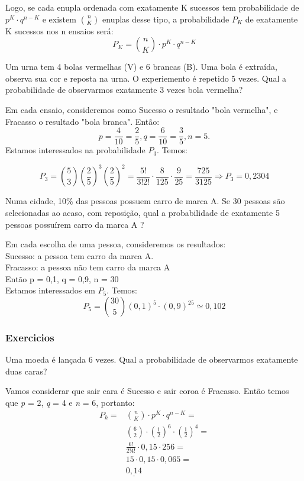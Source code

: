 \documentclass[10pt,a4paper]{article}
\begin{document}
Logo, se cada enupla ordenada com exatamente K sucessos tem probabilidade de $p^{K} \cdot q^{n-K}$ e existem $\binom{n}{K}$ enuplas desse tipo, a probabilidade $P_{K}$ de exatamente K sucessos nos n ensaios será:
\[
	P_{K} = \binom{n}{K} \cdot p^{K} \cdot q^{n-K}
\]

\begin{eg}
	Um urna tem 4 bolas vermelhas (V) e 6 brancas (B). Uma bola é extraída, observa sua cor e reposta na urna. O experiemento é repetido 5 vezes. Qual a probabilidade de observarmos exatamente 3 vezes bola vermelha?


Em cada ensaio, consideremos como Sucesso o resultado "bola vermelha", e Fracasso o resultado "bola branca". Então:
	\[
		p = \frac{4}{10} = \frac{2}{5}, q = \frac{6}{10} = \frac{3}{5}, n = 5.	
	\]
	Estamos interessados na probabilidade $P_{3}$. Temos:
	
	\[
		P_{3} = \binom{5}{3}(\frac{2}{5})^{3} (\frac{2}{5})^{2} = \frac{5!}{3!2!} \cdot \frac{8}{125} \cdot \frac{9}{25} = \frac{725}{3125} \Rightarrow
		P_{3} = 0,2304
	\]
\end{eg}

\begin{eg}
	Numa cidade, 10\% das pessoas possuem carro de marca A. Se 30 pessoas são selecionadas ao acaso, com reposição, qual a probabilidade de exatamente 5 pessoas possuírem carro da marca A ?
	
	Em cada escolha de uma pessoa, consideremos os resultados:\\
	Sucesso: a pessoa tem carro da marca A.\\
	Fracasso: a pessoa não tem carro da marca A\\
	Então p = 0,1,    q = 0,9,    n = 30\\
	Estamos interessados em $P_{5}$. Temos:
	\[
		P_{5} = \binom{30}{5}(0,1)^{5} \cdot (0,9)^{25} \simeq 0,102	
	\]
\end{eg}

\subsubsection{Exercicios}
\begin{ex}
	Uma moeda é lançada 6 vezes. Qual a probabilidade de observarmos exatamente duas caras?
\end{ex}
\begin{sol}
	Vamos considerar que sair cara é Sucesso e sair coroa é Fracasso. Então temos que \textit{p} = 2, \textit{q} = 4 e \textit{n} = 6, portanto:
	\[
		\begin{aligned}
		P_{k} =& \binom{n}{K} \cdot p^{K} \cdot q^{n-K} =		\\
		& \binom{6}{2} \cdot (\frac{1}{2})^{6} \cdot (\frac{1}{2})^{4} =\\
		& \frac{6!}{2!4!} \cdot 0,15 \cdot 256=\\
		& 15 \cdot 0,15 \cdot 0,065=\\
		& \underline{0,14}
		\end{aligned}
	\]
\end{sol}
\end{document}
